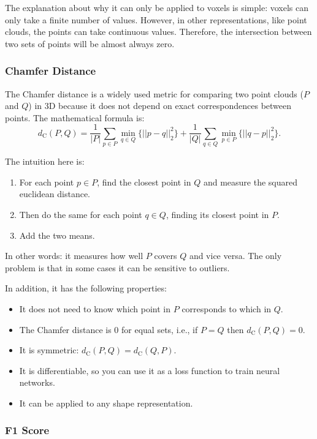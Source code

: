 The explanation about why it can only be applied to voxels is simple: voxels can only take a finite number of values. However, in other representations, like point clouds, the points can take continuous values. Therefore, the intersection between two sets of points will be almost always zero.

\subsubsection{Chamfer Distance}

The Chamfer distance is a widely used metric for comparing two point clouds ($P$ and $Q$) in 3D because it does not depend on exact correspondences between points. The mathematical formula is:
$$d_\text{C}(P, Q)=\dfrac{1}{|P|}\sum_{p\in P}\min_{q\in Q}\{||p-q||_2^2\}+\dfrac{1}{|Q|}\sum_{q\in Q}\min_{p\in P}\{||q-p||_2^2\}.$$

The intuition here is:
\begin{enumerate}
\item For each point $p\in P$, find the closest point in $Q$ and measure the squared euclidean distance.
\item Then do the same for each point $q\in Q$, finding its closest point in $P$.
\item Add the two means.
\end{enumerate}
In other words: it measures how well $P$ covers $Q$ and vice versa. The only problem is that in some cases it can be sensitive to outliers.

In addition, it has the following properties:
\begin{itemize}
\item It does not need to know which point in $P$ corresponds to which in $Q$.
\item The Chamfer distance is 0 for equal sets, i.e., if $P=Q$ then $d_\text{C}(P, Q)=0$.
\item It is symmetric: $d_\text{C}(P, Q)=d_\text{C}(Q, P)$.
\item It is differentiable, so you can use it as a loss function to train neural networks.
\item It can be applied to any shape representation.
\end{itemize}

\subsubsection{F1 Score}

